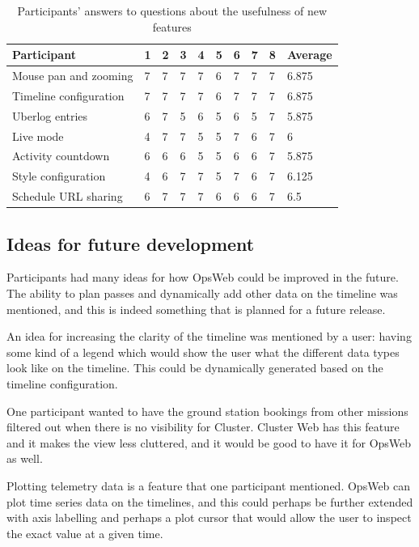 \begin{table}[!ht]
\def\arraystretch{1.1}%
    \begin{center}
    \caption{Participants' answers to questions about the usefulness of new features}
    \label{features_usefulness}
    \begin{tabular}{| l | l | l | l | l | l | l | l | l | l | }
    \hline
    Participant & 1 & 2 & 3 & 4 & 5 & 6 & 7 & 8 & Average  \\
    \hline
    Mouse pan and zooming    & 7  & 7 & 7 & 7 & 6 & 7 & 7 & 7 & 6.875   \\
    Timeline configuration    & 7  & 7 & 7 & 7 & 6 & 7 & 7 & 7 & 6.875    \\
    Uberlog entries    &  6 & 7 & 5 & 6 & 5 & 6 & 5 & 7 & 5.875   \\
    Live mode    & 4  & 7 & 7 & 5 & 5 & 7 & 6 & 7 & 6   \\
    Activity countdown    & 6  & 6 & 6 & 5 & 5 & 6 & 6 & 7 & 5.875   \\
    Style configuration    & 4  & 6 & 7 & 7 & 5 & 7 & 6 & 7 & 6.125   \\
    Schedule URL sharing    & 6  & 7 & 7 & 7 & 6 & 6 & 6 & 7 & 6.5   \\
    \hline
    \end{tabular}
    \end{center}
\end{table}

\subsection{Ideas for future development}
Participants had many ideas for how OpsWeb could be improved in the future. The ability to plan passes and dynamically add other data on the timeline was mentioned, and this is indeed something that is planned for a future release.

An idea for increasing the clarity of the timeline was mentioned by a user: having some kind of a legend which would show the user what the different data types look like on the timeline. This could be dynamically generated based on the timeline configuration.

One participant wanted to have the ground station bookings from other missions filtered out when there is no visibility for Cluster. Cluster Web has this feature and it makes the view less cluttered, and it would be good to have it for OpsWeb as well.

Plotting telemetry data is a feature that one participant mentioned. OpsWeb can plot time series data on the timelines, and this could perhaps be further extended with axis labelling and perhaps a plot cursor that would allow the user to inspect the exact value at a given time.

